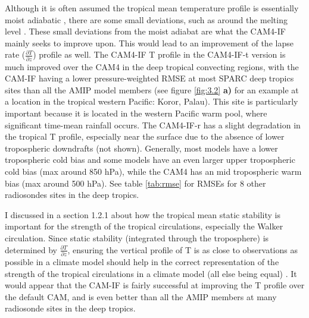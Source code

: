 \documentclass[letterpaper,12pt,titlepage,oneside,final]{book}
\begin{document}
Although it is often assumed the tropical mean temperature profile is essentially moist adiabatic \citep{emanuel_quasi-equilibrium_2007}, there are some small deviations, such as around the melting level \citep{folkins_melting_2013}. These small deviations from the moist adiabat are what the CAM4-IF mainly seeks to improve upon. This would lead to an improvement of the lapse rate ($\frac{\partial{T}}{\partial{z}}$) profile as well. 
The CAM4-IF T profile in the CAM4-IF-t version is much improved over the CAM4 in the deep tropical convecting regions, with the CAM-IF having a lower pressure-weighted RMSE at most SPARC deep tropics sites than all the AMIP model members (see figure \ref{fig:3.2} \textbf{a)} for an example at a location in the tropical western Pacific: Koror, Palau). This site is particularly important because it is located in the western Pacific warm pool, where significant time-mean rainfall occurs. The CAM4-IF-r has a slight degradation in the tropical T profile, especially near the surface due to the absence of lower tropospheric downdrafts (not shown). Generally, most models have a lower tropospheric cold bias and some models have an even larger upper tropospheric cold bias (max around 850 hPa), while the CAM4 has an mid tropospheric warm bias (max around 500 hPa). See table \ref{tab:rmse} for RMSEs for 8 other radiosondes sites in the deep tropics.

I discussed in a section 1.2.1 about how the tropical mean static stability is important for the strength of the tropical circulations, especially the Walker circulation. Since static stability (integrated through the troposphere) is determined by $\frac{\partial{T}}{\partial{z}}$, ensuring the vertical profile of T is as close to observations as possible in a climate model should help in the correct representation of the strength of the tropical circulations in a climate model (all else being equal) \citep{sohn_role_2016,mitas_recent_2006}. It would appear that the CAM-IF is fairly successful at improving the T profile over the default CAM, and is even better than all the AMIP members at many radiosonde sites in the deep tropics. 
\end{document}
